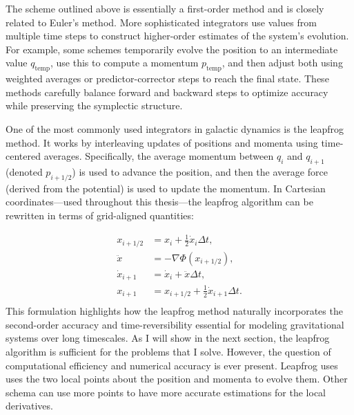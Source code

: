     The scheme outlined above is essentially a first-order method and is closely related to Euler's method. More sophisticated integrators use values from multiple time steps to construct higher-order estimates of the system's evolution. For example, some schemes temporarily evolve the position to an intermediate value $q_\mathrm{temp}$, use this to compute a momentum $p_\mathrm{temp}$, and then adjust both using weighted averages or predictor-corrector steps to reach the final state. These methods carefully balance forward and backward steps to optimize accuracy while preserving the symplectic structure.

    One of the most commonly used integrators in galactic dynamics is the leapfrog method. It works by interleaving updates of positions and momenta using time-centered averages. Specifically, the average momentum between $q_i$ and $q_{i+1}$ (denoted $p_{i+1/2}$) is used to advance the position, and then the average force (derived from the potential) is used to update the momentum. In Cartesian coordinates—used throughout this thesis—the leapfrog algorithm can be rewritten in terms of grid-aligned quantities:


    \begin{eqnarray}
        x_{i+1/2} &= x_i + \frac{1}{2} \dot{x}_i \Delta t , \\
        \ddot{x} &= -\nabla \Phi(x_{i+1/2}), \\
        \dot{x}_{i+1} &= \dot{x}_i + \ddot{x} \Delta t, \\
        x_{i+1} &= x_{i+1/2} + \frac{1}{2} \dot{x}_{i+1} \Delta t. \\
    \end{eqnarray}
    This formulation highlights how the leapfrog method naturally incorporates the second-order accuracy and time-reversibility essential for modeling gravitational systems over long timescales. As I will show in the next section, the leapfrog algorithm is sufficient for the problems that I solve. However, the question of computational efficiency and numerical accuracy is ever present. Leapfrog uses uses the two local points about the position and momenta to evolve them. Other schema can use more points to have more accurate estimations for the local derivatives. 
    
